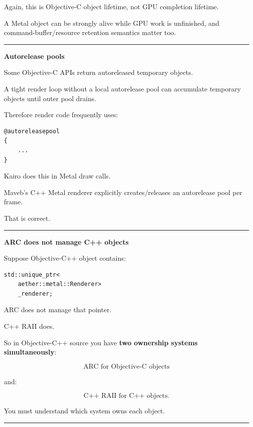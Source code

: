 Again, this is Objective-C object lifetime, not GPU completion lifetime.

A Metal object can be strongly alive while GPU work is unfinished, and command-buffer/resource retention semantics matter too.

\begin{center}\rule{0.5\linewidth}{0.5pt}\end{center}

\textbf{Autorelease pools}

Some Objective-C APIs return autoreleased temporary objects.

A tight render loop without a local autorelease pool can accumulate temporary objects until outer pool drains.

Therefore render code frequently uses:

\begin{verbatim}
@autoreleasepool
{
    ...
}
\end{verbatim}

Kairo does this in Metal draw calls.

Maveb's C++ Metal renderer explicitly creates/releases an autorelease pool per frame.

That is correct.

\begin{center}\rule{0.5\linewidth}{0.5pt}\end{center}

\textbf{ARC does not manage C++ objects}

Suppose Objective-C++ object contains:

\begin{verbatim}
std::unique_ptr<
    aether::metal::Renderer>
    _renderer;
\end{verbatim}

ARC does not manage that pointer.

C++ RAII does.

So in Objective-C++ source you have \textbf{two ownership systems simultaneously}:

\[
\boxed{
\text{ARC for Objective-C objects}
}
\]

and:

\[
\boxed{
\text{C++ RAII for C++ objects}.
}
\]

You must understand which system owns each object.

\begin{center}\rule{0.5\linewidth}{0.5pt}\end{center}

